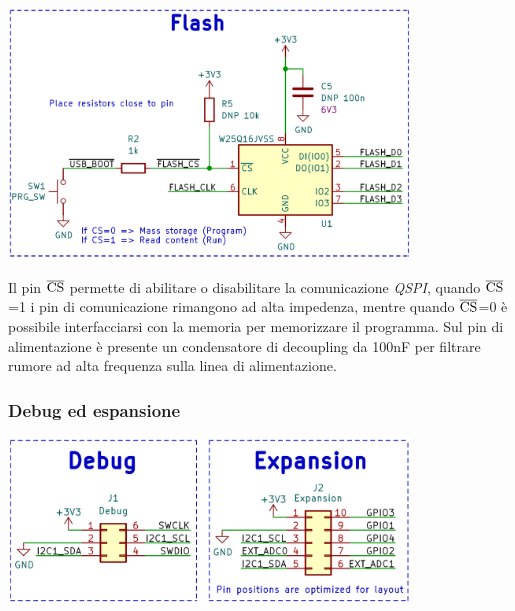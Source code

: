 \begin{center}
\includegraphics[width=0.8\textwidth]{figures/image49.png}
\captionsetup{type=figure}
\end{center}

\noindent Il pin $\overline{\rm {CS}}$ permette di abilitare o
disabilitare la comunicazione \emph{QSPI}, quando $\overline{\rm {CS}}$=1 i pin di
comunicazione rimangono ad alta impedenza, mentre quando $\overline{\rm {CS}}$=0 è
possibile interfacciarsi con la memoria per memorizzare il programma.
Sul pin di alimentazione è presente un condensatore di decoupling da 100nF per filtrare rumore ad alta
frequenza sulla linea di alimentazione.

\hypertarget{debug-ed-espansione}{%
\subsubsection{\texorpdfstring{\hfill\break
Debug ed espansione}{ Debug ed espansione}}\label{debug-ed-espansione}}

\begin{center}
\includegraphics[width=0.8\textwidth]{figures/image90.png}
\captionsetup{type=figure}
\end{center}

